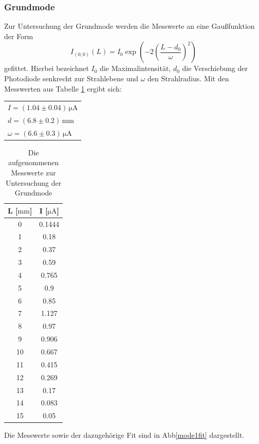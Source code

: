 \subsubsection{Grundmode}
Zur Untersuchung der Grundmode werden die Messwerte an eine Gaußfunktion der Form
\begin{equation}
\label{eqn:gauß}
  I_{(0, 0)}(L) = I_0\exp\left(-2\left(\frac{L - d_0}{\omega}\right)^2\right)
\end{equation}
gefittet. Hierbei bezeichnet $I_0$ die Maximalintensität, $d_0$ die Verschiebung der Photodiode senkrecht zur Strahlebene und $\omega$ den Strahlradius.
Mit den Messwerten aus Tabelle \ref{mode1} ergibt sich:
\begin{table}[]
  \centering
\begin{tabular}{l}
 $I=(1.04 \pm 0.04)\, \si{\micro\ampere}$\\
 $d=(6.8 \pm 0.2)\, \si{\milli\meter}$   \\
$\omega=(6.6 \pm 0.3)\,  \si{\micro\ampere}$
\end{tabular}
\end{table}
\begin{table}[]
  \centering

\begin{tabular}{c|c}
L [$ \si{\milli\meter}$]   &   I [$ \si{\micro\ampere}$]     \\
\hline
0  & 0.1444 \\
1  & 0.18   \\
2  & 0.37   \\
3  & 0.59   \\
4  & 0.765  \\
5  & 0.9    \\
6  & 0.85   \\
7  & 1.127  \\
8  & 0.97   \\
9  & 0.906  \\
10 & 0.667  \\
11 & 0.415  \\
12 & 0.269  \\
13 & 0.17   \\
14 & 0.083  \\
15 & 0.05
\end{tabular}
\caption{Die aufgenommenen Messwerte zur Untersuchung der Grundmode}
\label{mode1}
\end{table}
Die Messwerte sowie der dazugehörige Fit sind in Abb\ref{mode1fit} dargestellt.
